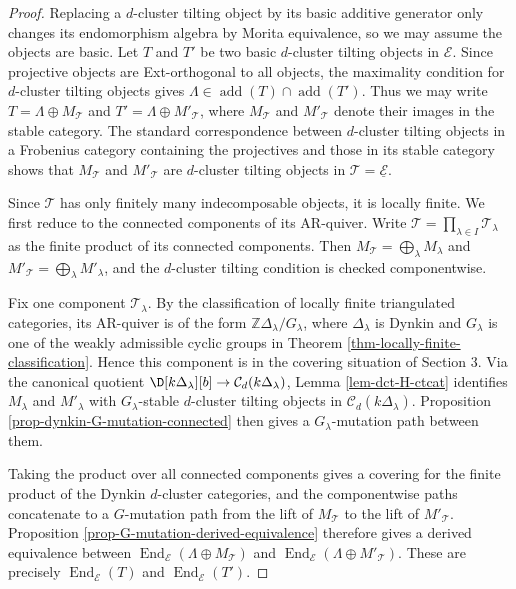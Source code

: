\documentclass[12pt]{article}
\theoremstyle{plain}
\theoremstyle{definition}
\DeclareMathOperator{\add}{add}
\DeclareMathOperator{\End}{End}
\newcommand{\Db}[1][]{\D[#1][b]}
\begin{document}
\begin{proof}
Replacing a \(d\)-cluster tilting object by its basic additive generator only
changes its endomorphism algebra by Morita equivalence, so we may assume the
objects are basic.  Let \(T\) and \(T'\) be two basic \(d\)-cluster tilting
objects in \(\mathcal E\).  Since projective objects are Ext-orthogonal to all
objects, the maximality condition for \(d\)-cluster tilting objects gives
\(\Lambda\in\add(T)\cap\add(T')\).  Thus we may write
\(T=\Lambda\oplus M_{\mathcal T}\) and
\(T'=\Lambda\oplus M'_{\mathcal T}\), where \(M_{\mathcal T}\) and
\(M'_{\mathcal T}\) denote their images in the stable category.  The standard
correspondence between \(d\)-cluster tilting objects in a Frobenius category
containing the projectives and those in its stable category shows that
\(M_{\mathcal T}\) and \(M'_{\mathcal T}\) are \(d\)-cluster tilting objects in
\(\mathcal T=\underline{\mathcal E}\).

Since \(\mathcal T\) has only finitely many indecomposable objects, it is
locally finite.  We first reduce to the connected components of its AR-quiver.
Write \(\mathcal T=\prod_{\lambda\in I}\mathcal T_\lambda\) as the finite
product of its connected components.  Then
\(M_{\mathcal T}=\bigoplus_{\lambda}M_\lambda\) and
\(M'_{\mathcal T}=\bigoplus_{\lambda}M'_\lambda\), and the \(d\)-cluster
tilting condition is checked componentwise.

Fix one component \(\mathcal T_\lambda\).  By the classification of locally
finite triangulated categories, its AR-quiver is of the form
\(\mathbb Z\Delta_\lambda/G_\lambda\), where \(\Delta_\lambda\) is Dynkin and
\(G_\lambda\) is one of the weakly admissible cyclic groups in Theorem
\ref{thm-locally-finite-classification}.  Hence this component is in the
covering situation of Section \(3\).  Via the canonical quotient
\(\Db[k\Delta_\lambda]\to\mathcal C_d(k\Delta_\lambda)\), Lemma
\ref{lem-dct-H-ctcat} identifies \(M_\lambda\) and \(M'_\lambda\) with
\(G_\lambda\)-stable \(d\)-cluster tilting objects in
\(\mathcal C_d(k\Delta_\lambda)\).  Proposition
\ref{prop-dynkin-G-mutation-connected} then gives a \(G_\lambda\)-mutation path
between them.

Taking the product over all connected components gives a covering for the
finite product of the Dynkin \(d\)-cluster categories, and the componentwise
paths concatenate to a \(G\)-mutation path from the lift of \(M_{\mathcal T}\)
to the lift of \(M'_{\mathcal T}\).  Proposition
\ref{prop-G-mutation-derived-equivalence} therefore gives a derived
equivalence between
\(\End_{\mathcal E}(\Lambda\oplus M_{\mathcal T})\) and
\(\End_{\mathcal E}(\Lambda\oplus M'_{\mathcal T})\).  These are precisely
\(\End_{\mathcal E}(T)\) and \(\End_{\mathcal E}(T')\).
\end{proof}
\end{document}
